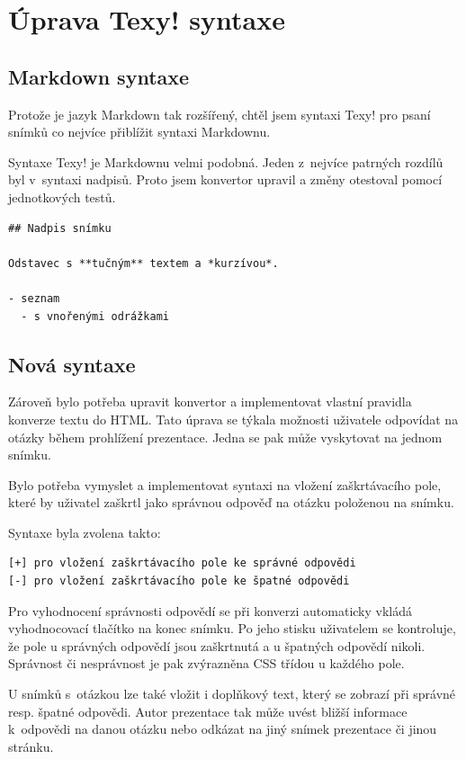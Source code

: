 \documentclass[11pt,twoside,a4paper]{book}
\begin{document}
\section{Úprava Texy! syntaxe}

\subsection{Markdown syntaxe}
Protože je jazyk Markdown tak rozšířený, chtěl jsem syntaxi Texy! pro psaní snímků co nejvíce přiblížit syntaxi
Markdownu.

Syntaxe Texy! je Markdownu velmi podobná. Jeden z~nejvíce patrných rozdílů byl v~syntaxi nadpisů. Proto jsem konvertor
upravil a změny otestoval pomocí jednotkových testů.

\begin{lstlisting}[caption=Ukázka syntaxe]
## Nadpis snímku

Odstavec s **tučným** textem a *kurzívou*.

- seznam
  - s vnořenými odrážkami
\end{lstlisting}

\subsection{Nová syntaxe}
Zároveň bylo potřeba upravit konvertor a implementovat vlastní pravidla konverze textu do HTML. Tato úprava se týkala
možnosti uživatele odpovídat na otázky během prohlížení prezentace. Jedna se pak může vyskytovat na jednom snímku.

Bylo potřeba vymyslet a implementovat syntaxi na vložení zaškrtávacího pole, které by uživatel zaškrtl jako správnou
odpověď na otázku položenou na snímku.

Syntaxe byla zvolena takto:

\begin{lstlisting}[caption=Syntaxe odpovědí]
[+] pro vložení zaškrtávacího pole ke správné odpovědi
[-] pro vložení zaškrtávacího pole ke špatné odpovědi
\end{lstlisting}

Pro vyhodnocení správnosti odpovědí se při konverzi automaticky vkládá vyhodnocovací tlačítko na konec snímku. Po jeho
stisku uživatelem se kontroluje, že pole u správných odpovědí jsou zaškrtnutá a u špatných odpovědí nikoli. Správnost
či nesprávnost je pak zvýrazněna CSS třídou u každého pole.

U snímků s~otázkou lze také vložit i doplňkový text, který se zobrazí při správné resp. špatné odpovědi. Autor
prezentace tak může uvést bližší informace k~odpovědi na danou otázku nebo odkázat na jiný snímek prezentace či jinou
stránku.
\end{document}
